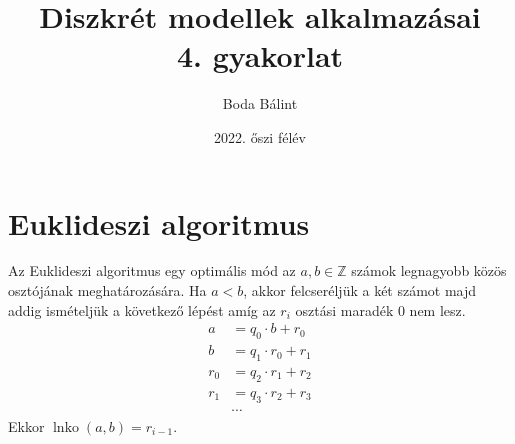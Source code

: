 \documentclass[a4paper,12pt]{article}
\title{\huge{Diszkrét modellek alkalmazásai} \\ \large 4. gyakorlat}
\author{Boda Bálint}
\date{2022. őszi félév}
\DeclareMathOperator{\lnko}{lnko}
\theoremstyle{definition}
\begin{document}
	\maketitle
	\section{Euklideszi algoritmus}
	Az Euklideszi algoritmus egy optimális mód az $a,b \in \mathbb{Z}$ számok legnagyobb közös osztójának meghatározására.
	Ha $a < b$, akkor felcseréljük a két számot majd addig ismételjük a következő lépést amíg az $r_i$ osztási maradék $0$ nem lesz.
	\begin{align*}
		a&=q_{0} \cdot b+r_{0}\\
		b&=q_{1} \cdot r_{0}+r_{1}\\
		r_{0}&=q_{2} \cdot r_{1}+r_{2}\\
		r_{1}&=q_{3} \cdot r_{2}+r_{3}\\
		&\dotsb
	\end{align*}
	Ekkor $\lnko{(a,b)} = r_{i-1}$.
\end{document}
